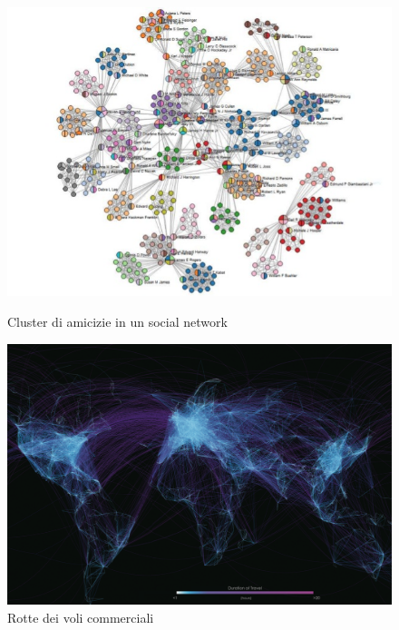 \begin{frame}
\begin{figure}[h]
		\pause
		\small 
		\begin{minipage}[t]{.45\textwidth}
			\centering
			\includegraphics[width=1\textwidth]{images/9_social}
			\small 
			\caption{Cluster di amicizie in un social network } %
		\end{minipage}\hfill
		\pause
		\begin{minipage}[t]{.45\textwidth}
			\centering
			\includegraphics[width=1\textwidth]{images/7_flight}
			\small 
			\caption{Rotte dei voli commerciali} %
		\end{minipage}
	\end{figure}
\end{frame}

